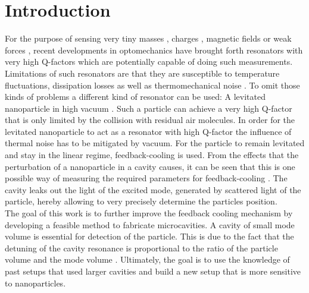 \chapter{Introduction}
For the purpose of sensing very tiny masses \cite{chaste2012nanomechanical, yang2006zeptogram}, charges \cite{cleland1998nanometre}, magnetic fields \cite{rugar2004single} or weak forces \cite{stipe2001noncontact, moser2013ultrasensitive}, recent developments in optomechanics \cite{arndt2014testing, aspelmeyer2012quantum, aspelmeyer2014cavity} have brought forth resonators with very high Q-factors which are potentially capable of doing such measurements. Limitations of such resonators are that they are susceptible to temperature fluctuations, dissipation losses as well as thermomechanical noise \cite{ekinci2004ultimate, aspelmeyer2012quantum, postma2005dynamic}. To omit those kinds of problems a different kind of resonator can be used: A levitated nanoparticle in high vacuum \cite{gieseler2013thermal}. Such a particle can achieve a very high Q-factor that is only limited by the collision with residual air molecules. In order for the levitated nanoparticle to act as a resonator with high Q-factor the influence of thermal noise has to be mitigated by vacuum. For the particle to remain levitated and stay in the linear regime, feedback-cooling is used. From the effects that the perturbation of a nanoparticle in a cavity causes, it can be seen that this is one possible way of measuring the required parameters for feedback-cooling \cite{tanjiinteraction, chang2010cavity}. The cavity leaks out the light of the excited mode, generated by scattered light of the particle, hereby allowing to very precisely determine the particles position.\\
The goal of this work is to further improve the feedback cooling mechanism by developing a feasible method to fabricate microcavities. A cavity of small mode volume is essential for detection of the particle. This is due to the fact that the detuning of the cavity resonance is proportional to the ratio of the particle volume and the mode volume \cite{chang2010cavity}. Ultimately, the goal is to use the knowledge of past setups that used larger cavities and build a new setup that is more sensitive to nanoparticles.







